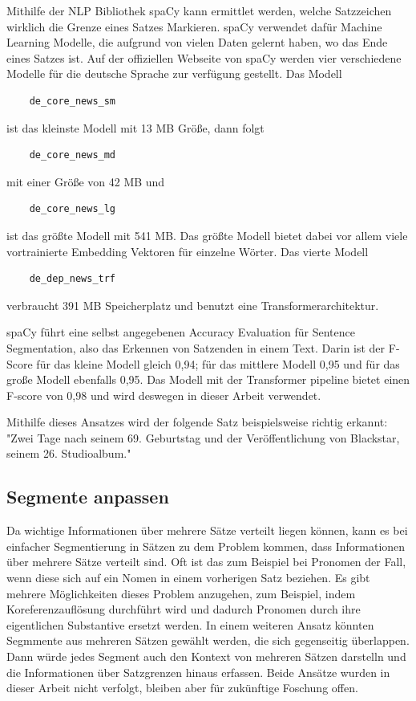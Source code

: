 Mithilfe der NLP Bibliothek spaCy kann ermittlet werden, welche Satzzeichen wirklich die Grenze eines Satzes Markieren.
spaCy verwendet dafür Machine Learning Modelle, die aufgrund von vielen Daten gelernt haben, wo das Ende eines Satzes ist.
Auf der offiziellen Webseite von spaCy werden vier verschiedene Modelle für die deutsche Sprache zur verfügung gestellt.
Das Modell 
\begin{verbatim}
    de_core_news_sm 
\end{verbatim} 
ist das kleinste Modell mit 13 MB Größe, dann folgt 
\begin{verbatim} 
    de_core_news_md 
\end{verbatim}
mit einer Größe von 42 MB und 
\begin{verbatim}
    de_core_news_lg 
\end{verbatim}
ist das größte Modell mit 541 MB.
Das größte Modell bietet dabei vor allem viele vortrainierte Embedding Vektoren für einzelne Wörter.
Das vierte Modell 
\begin{verbatim}
    de_dep_news_trf
\end{verbatim}
verbraucht 391 MB Speicherplatz und benutzt eine Transformerarchitektur.

spaCy führt eine selbst angegebenen Accuracy Evaluation für Sentence Segmentation, also das Erkennen von Satzenden in einem Text.
Darin ist der F-Score für das kleine Modell gleich 0,94; für das mittlere Modell 0,95 und für das große Modell ebenfalls 0,95.
Das Modell mit der Transformer pipeline bietet einen F-score von 0,98 und wird deswegen in dieser Arbeit verwendet. \cite{spacy2024}

Mithilfe dieses Ansatzes wird der folgende Satz beispielsweise richtig erkannt: 
"Zwei Tage nach seinem 69. Geburtstag und der Veröffentlichung von Blackstar, seinem 26. Studioalbum."

\subsection{Segmente anpassen}

Da wichtige Informationen über mehrere Sätze verteilt liegen können, kann es bei einfacher Segmentierung in Sätzen zu dem Problem kommen, dass Informationen über mehrere Sätze verteilt sind.
Oft ist das zum Beispiel bei Pronomen der Fall, wenn diese sich auf ein Nomen in einem vorherigen Satz beziehen.
Es gibt mehrere Möglichkeiten dieses Problem anzugehen, zum Beispiel, indem Koreferenzauflösung durchführt wird und dadurch Pronomen durch ihre eigentlichen Substantive ersetzt werden.
In einem weiteren Ansatz könnten Segmmente aus mehreren Sätzen gewählt werden, die sich gegenseitig überlappen.
Dann würde jedes Segment auch den Kontext von mehreren Sätzen darstelln und die Informationen über Satzgrenzen hinaus erfassen.
Beide Ansätze wurden in dieser Arbeit nicht verfolgt, bleiben aber für zukünftige Foschung offen.


